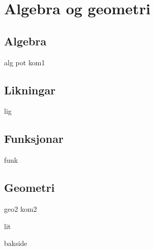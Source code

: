 \part{Algebra og geometri \label{Del2}}
\chapter{Algebra}
\newpage
{alg}
{pot}
\newpage
{kom1}

\chapter{Likningar \label{Likningar}}
\newpage
{lig}

\chapter{Funksjonar \label{Funksjoner}}
{funk}

\chapter{Geometri}
\newpage
{geo2}
\newpage
{kom2}

{lit}
{\printindex {}
	}
{bakside}

















